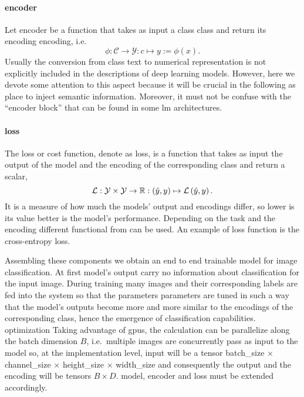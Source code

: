 \paragraph{encoder} Let \gls{encoder} be a function that takes as input a class
\gls{class} and return its encoding \gls{encoding}, i.e.\
\begin{equation}
  \phi: \mathcal{C} \to \mathcal{Y} : c \mapsto y := \phi \left(x\right).
  \label{eq:encoder}
\end{equation}
Usually the conversion from class text to numerical representation is not
explicitly included in the descriptions of deep learning models. However, here
we devote some attention to this aspect because it will be crucial in the
following as place to inject semantic information. Moreover, it must not be
confuse with the ``encoder block'' that can be found in some \acrshort{lm}
architectures.

\paragraph{loss} The loss or cost function, denote as \gls{loss}, is a function
that takes as input the output of the model and the encoding of the
corresponding class and return a scalar,
\begin{equation}
  \operatorname{\mathcal{L}}: \mathcal{Y} \times \mathcal{Y} \to \mathbb{R}
       : \left(\hat{y}, y\right) \mapsto \operatorname{\mathcal{L}} \left(\hat{y}, y\right).
  \label{eq:loss}
\end{equation}
It is a measure of how much the models' output and encodings differ, so lower
is its value better is the model's performance. Depending on the task and the
encoding different functional from can be used. An example of loss function is
the cross-entropy loss.

\medskip Assembling these components we obtain an end to end trainable model
for image classification. At first model's output carry no information about
classification for the input image. During training many images and their
corresponding labels are fed into the system so that the parameters
\gls{parameters} are tuned in such a way that the model's outputs become more
and more similar to the encodings of the corresponding class, hence the
emergence of classification capabilities. %
optimization Taking advantage of \acrshort{gpu}s, the calculation can be
parallelize along the batch dimension $B$, i.e.\ multiple images are
concurrently pass as input to the model so, at the implementation level,
\gls{input} will be a tensor \gls{batch_size} $\times$ \gls{channel_size}
$\times$ \gls{height_size} $\times$ \gls{width_size} and consequently the
output and the encoding will be tensors $B \times D$. \gls{model},
\gls{encoder} and \gls{loss} must be extended accordingly.


